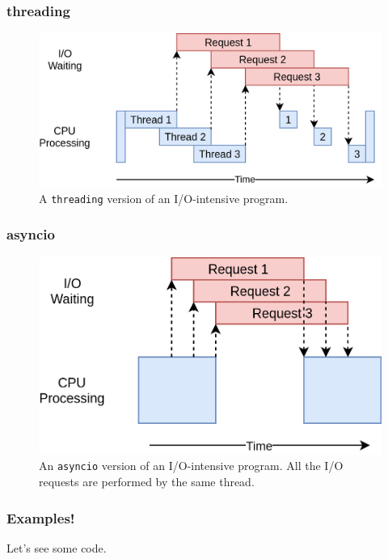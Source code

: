 \documentclass{beamer}
\begin{document}
    \begin{frame}
        \frametitle{threading}

        \begin{figure}
            \includegraphics[width=\linewidth]{../figures/Threading.png}
            \caption{A \texttt{threading} version of an I/O-intensive program.}
        \end{figure}

    \end{frame}

    \begin{frame}
        \frametitle{asyncio}

        \begin{figure}
            \includegraphics[width=\linewidth]{../figures/Asyncio.png}
            \caption{An \texttt{asyncio} version of an I/O-intensive program. All the I/O requests are
            performed by the same thread.}
        \end{figure}

    \end{frame}

    \begin{frame}
        \frametitle{Examples!}
        \centering
        Let's see some code.

    \end{frame}
\end{document}
